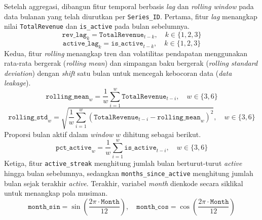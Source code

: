 Setelah aggregasi, dibangun fitur temporal berbasis \textit{lag} dan \textit{rolling window} pada data bulanan yang telah diurutkan per \texttt{Series\_ID}. Pertama, fitur \textit{lag} menangkap nilai \texttt{TotalRevenue} dan \texttt{is\_active} pada bulan sebelumnya.
\begin{equation}
\texttt{rev\_lag}_{k} = \texttt{TotalRevenue}_{t-k}, \quad k \in \{1, 2, 3\}
\end{equation}
\begin{equation}
\texttt{active\_lag}_{k} = \texttt{is\_active}_{t-k}, \quad k \in \{1, 2, 3\}
\end{equation}
Kedua, fitur \textit{rolling} menangkap tren dan volatilitas pendapatan menggunakan rata-rata bergerak (\textit{rolling mean}) dan simpangan baku bergerak (\textit{rolling standard deviation}) dengan \textit{shift} satu bulan untuk mencegah kebocoran data (\textit{data leakage}).
\begin{equation}
\texttt{rolling\_mean}_{w} = \frac{1}{w}\sum_{i=1}^{w}\texttt{TotalRevenue}_{t-i}, \quad w \in \{3, 6\}
\end{equation}
\begin{equation}
\texttt{rolling\_std}_{w} = \sqrt{\frac{1}{w}\sum_{i=1}^{w}\left(\texttt{TotalRevenue}_{t-i} - \texttt{rolling\_mean}_{w}\right)^{2}}, \quad w \in \{3, 6\}
\end{equation}
Proporsi bulan aktif dalam \textit{window} $w$ dihitung sebagai berikut.
\begin{equation}
\texttt{pct\_active}_{w} = \frac{1}{w}\sum_{i=1}^{w}\texttt{is\_active}_{t-i}, \quad w \in \{3, 6\}
\end{equation}
Ketiga, fitur \texttt{active\_streak} menghitung jumlah bulan berturut-turut \textit{active} hingga bulan sebelumnya, sedangkan \texttt{months\_since\_active} menghitung jumlah bulan sejak terakhir \textit{active}. Terakhir, variabel \textit{month} dienkode secara siklikal untuk menangkap pola musiman.
\begin{equation}
\texttt{month\_sin} = \sin\left(\frac{2\pi \cdot \texttt{Month}}{12}\right), \quad \texttt{month\_cos} = \cos\left(\frac{2\pi \cdot \texttt{Month}}{12}\right)
\end{equation}


